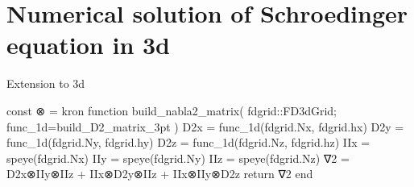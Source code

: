 \chapter{Numerical solution of Schroedinger equation in 3d}

Extension to 3d

\begin{juliacode}
const ⊗ = kron
function build_nabla2_matrix( fdgrid::FD3dGrid; func_1d=build_D2_matrix_3pt )
    D2x = func_1d(fdgrid.Nx, fdgrid.hx)
    D2y = func_1d(fdgrid.Ny, fdgrid.hy)
    D2z = func_1d(fdgrid.Nz, fdgrid.hz)
    IIx = speye(fdgrid.Nx)
    IIy = speye(fdgrid.Ny)
    IIz = speye(fdgrid.Nz)
    ∇2 = D2x⊗IIy⊗IIz + IIx⊗D2y⊗IIz + IIx⊗IIy⊗D2z 
    return ∇2
end
\end{juliacode}